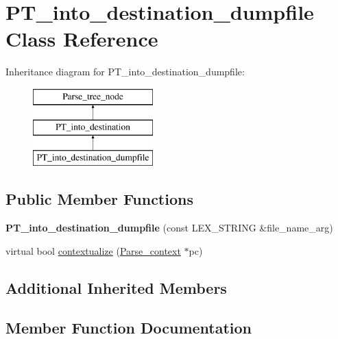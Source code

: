 \hypertarget{classPT__into__destination__dumpfile}{}\section{P\+T\+\_\+into\+\_\+destination\+\_\+dumpfile Class Reference}
\label{classPT__into__destination__dumpfile}
Inheritance diagram for P\+T\+\_\+into\+\_\+destination\+\_\+dumpfile\+:\begin{figure}[H]
\begin{center}
\leavevmode
\includegraphics[height=3.000000cm]{classPT__into__destination__dumpfile}
\end{center}
\end{figure}
\subsection*{Public Member Functions}
\begin{DoxyCompactItemize}
\item 
\mbox{\label{classPT__into__destination__dumpfile_a4dafe425787b139197722162c3136a17}} 
{\bfseries P\+T\+\_\+into\+\_\+destination\+\_\+dumpfile} (const L\+E\+X\+\_\+\+S\+T\+R\+I\+NG \&file\+\_\+name\+\_\+arg)
\item 
virtual bool \mbox{\hyperlink{classPT__into__destination__dumpfile_ab3870bce818779ff992c7025bad8d13d}{contextualize}} (\mbox{\hyperlink{structParse__context}{Parse\+\_\+context}} $\ast$pc)
\end{DoxyCompactItemize}
\subsection*{Additional Inherited Members}


\subsection{Member Function Documentation}
\mbox{\label{classPT__into__destination__dumpfile_ab3870bce818779ff992c7025bad8d13d}} 
